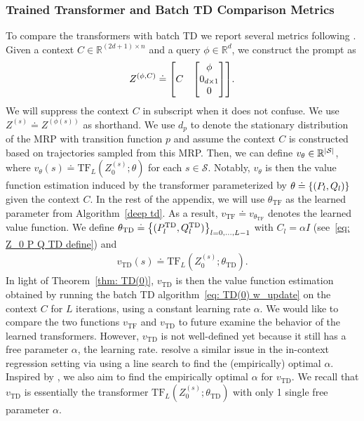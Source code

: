 \documentclass{article}
\newcommand{\fS}{\mathcal{S}}
\newcommand{\R}{\mathbb{R}}
\newcommand{\tf}{\text{TF}}
\newcommand{\td}{\text{TD}}
\begin{document}
\subsubsection{Trained Transformer and Batch TD Comparison Metrics} \label{appendix: comparison metrics}
To compare the transformers with batch TD we report several metrics following \citet{vonoswald2023transformers, akyurek2023learning}.
Given a context $C \in \R^{(2d+1) \times n}$ and a query $\phi \in \R^d$,
we construct the prompt as
\begin{align}
    Z^{(\phi, C)} \doteq \mqty[C & \mqty[\phi \\ 0_{d \times 1} \\ 0]].
\end{align}
We will suppress the context $C$ in subscript when it does not confuse.
We use $Z^{(s)} \doteq Z^{(\phi(s))}$ as shorthand.
We use $d_p$ to denote the stationary distribution of the MRP with transition function $p$
and assume the context $C$ is constructed based on trajectories sampled from this MRP.
Then, we can define $v_{\theta} \in \R^{\abs{\fS}}$, where $v_{\theta}(s) \doteq \tf_L(Z_0^{(s)}; \theta)$ for each $s \in \mathcal{S}$.
Notably,
$v_\theta$ is then the value function estimation induced by the transformer parameterized by $\theta \doteq \qty{(P_l, Q_l)}$ given the context $C$.
In the rest of the appendix,
we will use $\theta_\tf$ as the learned parameter from Algorithm~\ref{deep td}.
As a result, $v_\tf \doteq v_{\theta_\tf}$ denotes the learned value function.
We define $\theta_\td \doteq \qty{(P_l^\td, Q_l^\td)}_{l=0,\dots, L-1}$ with $C_l = \alpha I$ (see~\eqref{eq: Z_0 P Q TD define}) and
\begin{align}
    v_\td(s) \doteq \tf_L(Z_0^{(s)}; \theta_\td).
\end{align}
In light of Theorem~\ref{thm: TD(0)},
$v_\td$ is then the value function estimation obtained by running the batch TD algorithm~\eqref{eq: TD(0) w_update} on the context $C$ for $L$ iterations,
using a constant learning rate $\alpha$.
We would like to compare the two functions $v_\tf$ and $v_\td$ to future examine the behavior of the learned transformers.
However,
$v_\td$ is not well-defined yet because it still has a free parameter $\alpha$,
the learning rate.
\cite{vonoswald2023transformers} resolve a similar issue in the in-context regression setting
via using a line search to find the (empirically) optimal $\alpha$.
Inspired by \cite{vonoswald2023transformers},
we also aim to find the empirically optimal $\alpha$ for $v_\td$.
We recall that $v_\td$ is essentially the transformer $\tf_L(Z_0^{(s)}; \theta_\td)$ with only 1 single free parameter $\alpha$.
\end{document}
